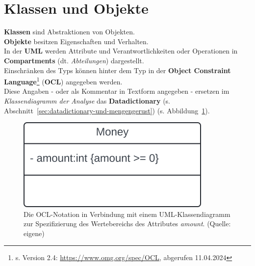 \section{Klassen und Objekte}

\noindent
\textbf{Klassen} sind Abstraktionen von Objekten.\\

\noindent
\textbf{Objekte} besitzen Eigenschaften und Verhalten.\\

\noindent
In der \textbf{UML} werden Attribute und Verantwortlichkeiten oder Operationen in \textbf{Compartments} (dt. \textit{Abteilungen}) dargestellt.\\

\noindent
Einschränken des Typs können hinter dem Typ in der \textbf{Object Constraint Language}\footnote{
s. Version 2.4: \url{https://www.omg.org/spec/OCL}, abgerufen 11.04.2024
} (\textbf{OCL}) angegeben werden.\\
Diese Angaben - oder als Kommentar in Textform angegeben - ersetzen im \textit{Klassendiagramm der Analyse} das \textbf{Datadictionary} (s. Abschnitt~\ref{sec:datadictionary-und-mengengerust}) (s. Abbildung~\ref{fig:moneyocl}).

\begin{figure}
    \centering
    \includegraphics[scale=0.4]{part two/Objektorientierte Analyse/img/moneyocl}
    \caption{Die OCL-Notation in Verbindung mit einem UML-Klassendiagramm zur Spezifizierung des Wertebereichs des Attributes \textit{amount}. (Quelle: eigene)}
    \label{fig:moneyocl}
\end{figure}